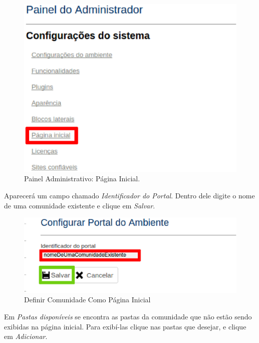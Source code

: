 \begin{figure}[h]
     \centering
       \includegraphics[keepaspectratio=true,scale=0.55]{figuras/adminPaginaInicial.eps}
     \caption{Painel Administrativo: Página Inicial.}
     \label{fig:adminPaginaInicial}
\end{figure}

\newpage
Aparecerá um campo chamado \emph{\color{red}Identificador do Portal}. Dentro dele digite o nome de uma comunidade existente e clique em \emph{\color{green}Salvar}.

\begin{figure}[h]
     \centering
       \includegraphics[keepaspectratio=true,scale=0.45]{figuras/configurarPortalDoAmbiente.eps}
     \caption{Definir Comunidade Como Página Inicial}
     \label{fig:adminPaginaInicial}
\end{figure}

Em \emph{\color{yellow}Pastas disponíveis} se encontra as pastas da comunidade que não estão sendo exibidas na página inicial. Para exibí-las clique nas pastas que desejar, e clique em \emph{\color{blue}Adicionar}.

